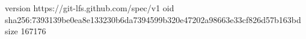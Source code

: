 version https://git-lfs.github.com/spec/v1
oid sha256:7393139be0ea8e133230b6da7394599b320e47202a98663e33cf826d57b163bd
size 167176
